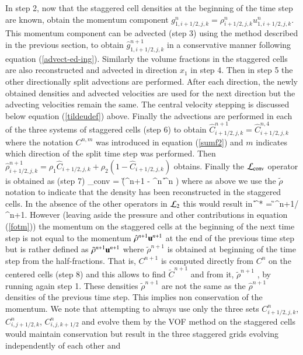 In step 2, now that the staggered cell densities at the beginning of the time step are known, 
obtain the momentum component $g^n_{1,i+1/2,j,k} = \rho^{n}_{i+1/2,j,k} u^{n}_{1,i+1/2,j,k}$. 
This momentum component can be advected (step 3) using the method described in the previous section, to 
obtain  $\hat g^{n+1}_{1,i+1/2,j,k}$  in a  conservative manner
following equation (\ref{advect-ed-ing}). 
Similarly the  volume fractions in the staggered cells are also reconstructed and advected in
direction $x_1$  in step 4. 
Then in step 5 the other directionally split advections are performed. 
After each direction, the newly obtained densities and advected velocities are used for the next direction
but the advecting velocities remain the same. The central velocity stepping is discussed 
below equation (\ref{tildeudef}) above. 
Finally the advections are performed in each of the three systems of staggered cells (step 6) to obtain  
$\hat C^{n+1}_{i+1/2,j,k} = \hat C^{n,4}_{i+1/2,j,k}$  where the 
notation $C^{n,m}$ was introduced in equation (\ref{sumf2}) and $m$ indicates which direction of the 
split time step was performed. Then $\hat \rho^{n+1}_{i+1/2,j,k} = \rho_1 \hat  C_{i+1/2,j,k} + \rho_2 ( 1 - \hat C_{i+1/2,j,k} ) $ obtains.
Finally the ${\cal L}_{\rm conv}$ operator is obtained as (step 7) 
\be
 \LLL_{\rm conv} =   \tau (\hat \G^{n+1} - \tilde \rho^{n} \U^n \label{unp11})
\nd
where as above we use the $\tilde \rho$ notation to indicate that the density has been 
reconstructed in the staggered cells.
In the absence of the other operators in ${\cal L}_2$ this would result 
in
\be
\U^* = \hat \G^{n+1}/ \hat \rho^{n+1}.
\nd
However (leaving aside the pressure and other contributions in equation  (\ref{fotm}))
 the momentum on the staggered cells at the beginning of the next
time step is not equal to the momentum $\hat \rho^{n+1} {\bf u}^{n+1}$ at the end of the previous 
time step but is rather defined as $\tilde \rho^{n+1} {\bf u}^{n+1}$ where  $\tilde \rho^{n+1}$ is 
obtained at beginning of the time step from the half-fractions. That is, $C^{n+1}$ is computed 
directly from $C^{n}$ on the centered cells (step 8) and this allows to find 
 $\tilde C^{n+1}$ and from it, $\tilde \rho^{n+1}$ , by running again step 1. These densities  $\tilde \rho^{n+1}$ are not
the same as the  $\hat \rho^{n+1}$  densities of the previous time step. This implies non conservation of the momentum.
We note that  attempting to always use only the three sets
 $C^{n}_{i+1/2,j,k}$,  $C^{n}_{i,j+1/2,k}$,  $C^{n}_{i,j,k+1/2}$ and evolve them by 
the VOF method on the staggered cells 
would maintain conservation but result in the three staggered grids evolving independently of each other and
